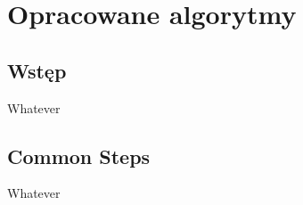 \chapter{Opracowane algorytmy}
\label{c4}

\section{Wstęp}
\label{c41}

Whatever

\section{Common Steps}
\label{c42}

Whatever